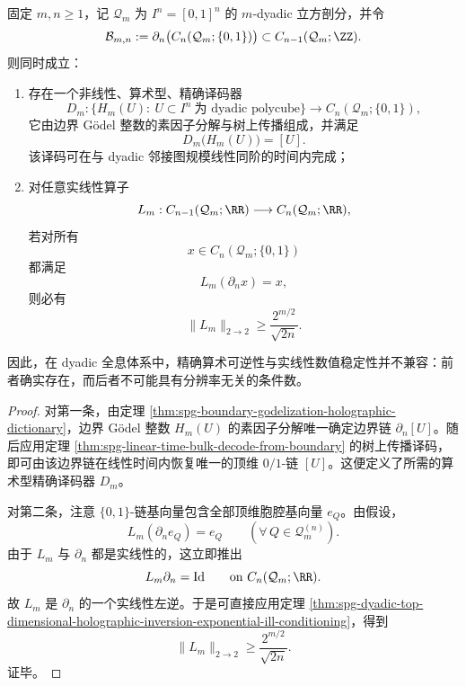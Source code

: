 \begin{theorem}\label{thm:conclusion-godel-arithmetic-exact-vs-linear-stable-separation}
固定 \(m,n\ge 1\)，记 \(\mathcal Q_m\) 为 \(I^n=[0,1]^n\) 的 \(m\)-dyadic 立方剖分，并令
\[
\mathcal B_{m,n}:=\partial_n\bigl(C_n(\mathcal Q_m;\{0,1\})\bigr)
\subset C_{n-1}(\mathcal Q_m;\ZZ).
\]
则同时成立：
\begin{enumerate}
  \item 存在一个非线性、算术型、精确译码器
        \[
        D_m:\bigl\{H_m(U):\ U\subset I^n\ \text{为 dyadic polycube}\bigr\}
        \longrightarrow
        C_n(\mathcal Q_m;\{0,1\}),
        \]
        它由边界 Gödel 整数的素因子分解与树上传播组成，并满足
        \[
        D_m\bigl(H_m(U)\bigr)=[U].
        \]
        该译码可在与 dyadic 邻接图规模线性同阶的时间内完成；
  \item 对任意实线性算子
        \[
        L_m:C_{n-1}(\mathcal Q_m;\RR)\longrightarrow C_n(\mathcal Q_m;\RR),
        \]
        若对所有
        \[
        x\in C_n(\mathcal Q_m;\{0,1\})
        \]
        都满足
        \[
        L_m(\partial_n x)=x,
        \]
        则必有
        \[
        \|L_m\|_{2\to 2}\ge \frac{2^{m/2}}{\sqrt{2n}}.
        \]
\end{enumerate}
因此，在 dyadic 全息体系中，精确算术可逆性与实线性数值稳定性并不兼容：前者确实存在，而后者不可能具有分辨率无关的条件数。
\end{theorem}
\begin{proof}
对第一条，由定理 \ref{thm:spg-boundary-godelization-holographic-dictionary}，边界 Gödel 整数 \(H_m(U)\) 的素因子分解唯一确定边界链 \(\partial_n[U]\)。随后应用定理 \ref{thm:spg-linear-time-bulk-decode-from-boundary} 的树上传播译码，即可由该边界链在线性时间内恢复唯一的顶维 \(0/1\)-链 \([U]\)。这便定义了所需的算术型精确译码器 \(D_m\)。

对第二条，注意 \(\{0,1\}\)-链基向量包含全部顶维胞腔基向量 \(e_Q\)。由假设，
\[
L_m(\partial_n e_Q)=e_Q
\qquad
(\forall\,Q\in \mathcal Q_m^{(n)}).
\]
由于 \(L_m\) 与 \(\partial_n\) 都是实线性的，这立即推出
\[
L_m\partial_n=\mathrm{Id}
\qquad\text{on } C_n(\mathcal Q_m;\RR).
\]
故 \(L_m\) 是 \(\partial_n\) 的一个实线性左逆。于是可直接应用定理 \ref{thm:spg-dyadic-top-dimensional-holographic-inversion-exponential-ill-conditioning}，得到
\[
\|L_m\|_{2\to 2}\ge \frac{2^{m/2}}{\sqrt{2n}}.
\]
证毕。
\end{proof}

